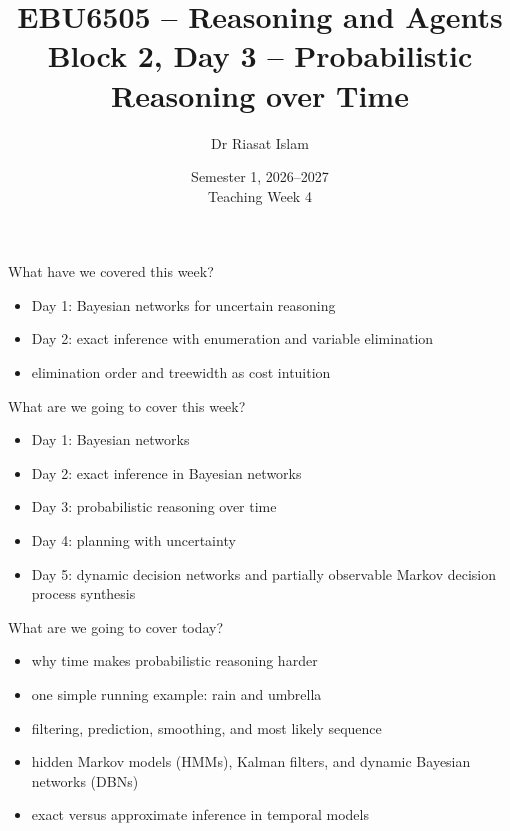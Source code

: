 \documentclass[aspectratio=169]{beamer}
\title[EBU6505 B2 D3]{EBU6505 -- Reasoning and Agents\\Block 2, Day 3 -- Probabilistic Reasoning over Time}
\author{Dr Riasat Islam}
\institute{Queen Mary University of London}
\date[Teaching Week 4]{Semester 1, 2026--2027 \\ Teaching Week 4}
\newcommand{\defaultdeckrefs}{AIMA4e Ch.14 pp.461--499; Poole3e Ch.9 pp.375--458}
\newcommand{\currentsliderefs}{\defaultdeckrefs}
\newcommand{\setslideref}[1]{\gdef\currentsliderefs{#1}}
\begin{document}
\setslideref{AIMA4e Ch.14 pp.461--499; Poole3e Ch.9 pp.375--458}
\begin{frame}
  \titlepage
\end{frame}

\begin{frame}{What have we covered this week?}
\begin{itemize}
  \item Day 1: Bayesian networks for uncertain reasoning
  \item Day 2: exact inference with enumeration and variable elimination
  \item elimination order and treewidth as cost intuition
\end{itemize}
\end{frame}

\begin{frame}{What are we going to cover this week?}
\begin{itemize}
  \item Day 1: Bayesian networks
  \item Day 2: exact inference in Bayesian networks
  \item Day 3: probabilistic reasoning over time
  \item Day 4: planning with uncertainty
  \item Day 5: dynamic decision networks and partially observable Markov decision process synthesis
\end{itemize}
\end{frame}

\begin{frame}{What are we going to cover today?}
\begin{itemize}
  \item why time makes probabilistic reasoning harder
  \item one simple running example: rain and umbrella
  \item filtering, prediction, smoothing, and most likely sequence
  \item hidden Markov models (HMMs), Kalman filters, and dynamic Bayesian networks (DBNs)
  \item exact versus approximate inference in temporal models
\end{itemize}
\end{frame}
\end{document}
